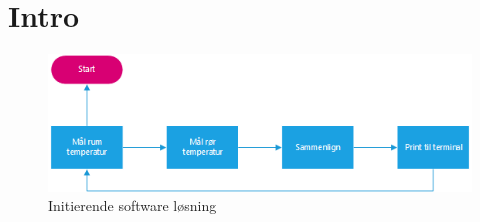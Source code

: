 \section{Intro}
\begin{figure}[h!]
  \centering
  \includegraphics[width=1\textwidth]{figures/Fase1software.png}
  \caption{Initierende software løsning}
\end{figure}
